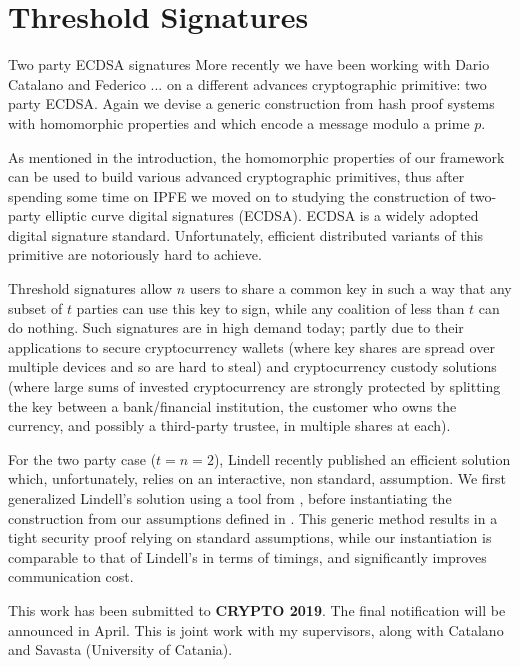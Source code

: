 \documentclass[10pt]{beamer}
\begin{document}
\section{Threshold Signatures}
\begin{frame}{Two party ECDSA signatures}
More recently we have been working with Dario Catalano and Federico ... on a different advances cryptographic primitive: two party ECDSA. Again we devise a generic construction from hash proof systems with homomorphic properties and which encode a message modulo a prime $p$.

As mentioned in the introduction, the homomorphic properties of our framework can be used to build various advanced cryptographic primitives, thus after spending some time on IPFE we moved on to studying the construction of two-party elliptic curve digital signatures (ECDSA).
%
ECDSA is a widely adopted digital signature standard. Unfortunately, efficient distributed variants of this primitive are notoriously hard to achieve. 

Threshold signatures allow $n$ users to share a common key in such a way that any subset of $t$ parties can use this key to sign, while any coalition of less than $t$ can do nothing. 
%
Such signatures are in high demand today; partly due to their applications to secure cryptocurrency wallets (where key shares are spread over multiple devices and so are hard to steal) and cryptocurrency custody solutions (where large sums of invested cryptocurrency are strongly protected by splitting the key between a bank/financial institution, the customer who owns the currency, and possibly a third-party trustee, in multiple shares at each).

For the two party case ($t=n=2$), Lindell \cite{C:Lindell17} recently published an efficient solution which, unfortunately, relies on an interactive, non standard, assumption. We first generalized Lindell’s solution using a tool from \cite{EC:CraSho02}, before instantiating the construction from our assumptions defined in \cite{AC:CasLagTuc18}. This generic method results in a tight security proof relying on standard assumptions, while
%
our instantiation is comparable to that of Lindell's in terms of timings, and significantly improves communication cost.

This work has been submitted to \textbf{CRYPTO 2019}. The final notification will be announced in April. This is joint work with my supervisors, along with Catalano and Savasta (University of Catania).


\end{frame}
\end{document}
